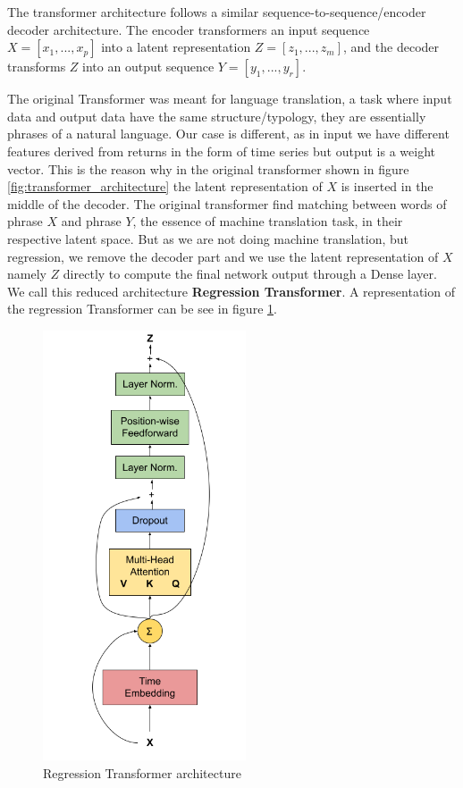 The transformer architecture follows a similar sequence-to-sequence/encoder decoder architecture. The encoder transformers an input sequence $X=[x_1,...,x_p]$ into a latent representation $Z=[z_1,...,z_m]$, and the decoder transforms $Z$ into an output sequence $Y=[y_1,...,y_r]$.  

The original Transformer was meant for language translation, a task where input data and output data have the same structure/typology, they are essentially phrases of a natural language. Our case is different, as in input we have different features derived from returns in the form of time series but output is a weight vector. This is the reason why in the original transformer shown in figure \ref{fig:transformer_architecture} the latent representation of $X$ is inserted in the middle of the decoder. The original transformer find matching between words of phrase $X$ and phrase $Y$, the essence of machine translation task, in their respective latent space. But as we are not doing machine translation, but regression, we remove the decoder part and we use the latent representation of $X$ namely $Z$ directly to compute the final network output through a Dense layer. We call this reduced architecture \textbf{Regression Transformer}. A representation of the regression Transformer can be see in figure \ref{fig:regression_transformer}.

\begin{figure}[h]
    \centering
    \includegraphics[width=6cm]{cap3/Regression_Transformer.png}
    \caption{Regression Transformer architecture}
    \label{fig:regression_transformer}
\end{figure}

